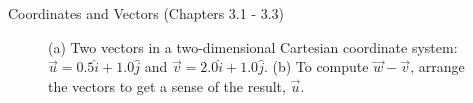 \documentclass{beamer}
\begin{document}
\begin{frame}{Coordinates and Vectors (Chapters 3.1 - 3.3)}
\begin{figure}
\centering
{}
\caption{\label{fig:twovectors3} (a) Two vectors in a two-dimensional Cartesian coordinate system: $\vec{u} = 0.5\hat{i}+1.0\hat{j}$ and $\vec{v} = 2.0\hat{i}+1.0\hat{j}$.  (b) To compute $\vec{w}-\vec{v}$, arrange the vectors to get a sense of the result, $\vec{u}$.}
\end{figure}
\end{frame}
\end{document}
